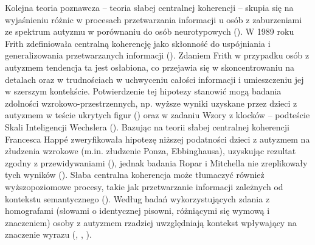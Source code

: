     Kolejna teoria poznawcza -- teoria słabej centralnej koherencji -- skupia się na wyjaśnieniu różnic w procesach przetwarzania informacji u osób z zaburzeniami ze spektrum autyzmu w porównaniu do osób neurotypowych (\cite{happe2006weak}).
    W 1989 roku Frith zdefiniowała centralną koherencję jako skłonność do uspójniania i generalizowania przetwarzanych informacji (\cite{frith2008autyzm}).
    Zdaniem Frith w przypadku osób z autyzmem tendencja ta jest osłabiona, co przejawia się w skoncentrowaniu na detalach oraz w trudnościach w uchwyceniu całości informacji i umieszczeniu jej w szerszym kontekście.
    Potwierdzenie tej hipotezy stanowić mogą badania zdolności wzrokowo-przestrzennych, np. wyższe wyniki uzyskane przez dzieci z autyzmem w teście ukrytych figur (\cite{shah1983islet}) oraz w zadaniu Wzory z klocków -- podteście Skali Inteligencji Wechslera (\cite{shah1993autistic}).
    Bazując na teorii słabej centralnej koherencji Francesca Happ{\'e} zweryfikowała hipotezę niższej podatności dzieci z autyzmem na złudzenia wzrokowe (m.in. złudzenie Ponza, Ebbinghausa), uzyskując rezultat zgodny z przewidywaniami (\cite{happe1996studying}), jednak badania Ropar i Mitchella nie zreplikowały tych wyników (\cite{ropar1999individuals}).
    Słaba centralna koherencja może tłumaczyć również wyższopoziomowe procesy, takie jak przetwarzanie informacji zależnych od kontekstu semantycznego (\cite{frith2008autyzm}).
    Według badań wykorzystujących zdania z homografami (słowami o identycznej pisowni, różniącymi się wymową i znaczeniem) osoby z autyzmem rzadziej uwzględniają kontekst wpływający na znaczenie wyrazu (\cite{frith1983reading}, \cite{happe1997central}, \cite{jolliffe1999test}).  
    
